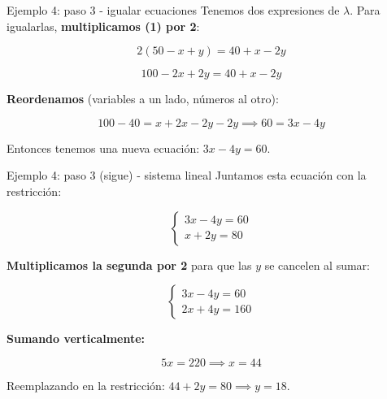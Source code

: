 \documentclass{beamer}
\begin{document}
\begin{frame}{Ejemplo 4: paso 3 - igualar ecuaciones}
    \small
    Tenemos dos expresiones de $\lambda$. Para igualarlas, \textbf{multiplicamos (1) por 2}:

    \[
    2(50 - x + y) = 40 + x - 2y
    \]

    \[
    100 - 2x + 2y = 40 + x - 2y
    \]

    \vspace{0.3em}

    \textbf{Reordenamos} (variables a un lado, números al otro):

    \[
    100 - 40 = x + 2x - 2y - 2y \implies 60 = 3x - 4y
    \]

    \vspace{0.5em}

    Entonces tenemos una nueva ecuación: $3x - 4y = 60$.
\end{frame}

\begin{frame}{Ejemplo 4: paso 3 (sigue) - sistema lineal}
    \small
    Juntamos esta ecuación con la restricción:

    \[
    \begin{cases}
    3x - 4y = 60 \\
    x + 2y = 80
    \end{cases}
    \]

    \vspace{0.5em}

    \textbf{Multiplicamos la segunda por 2} para que las $y$ se cancelen al sumar:

    \[
    \begin{cases}
    3x - 4y = 60 \\
    2x + 4y = 160
    \end{cases}
    \]

    \vspace{0.3em}

    \textbf{Sumando verticalmente:}

    \[
    5x = 220 \implies x = 44
    \]

    \vspace{0.3em}

    Reemplazando en la restricción: $44 + 2y = 80 \implies y = 18$.
\end{frame}
\end{document}
